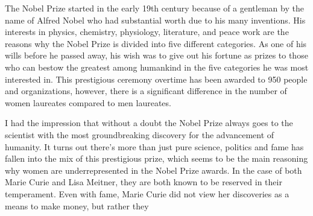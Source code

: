 
\par
The Nobel Prize started in the early 19th century because of a gentleman by the name of Alfred Nobel who had 
substantial worth due to his many inventions. His interests in physics, chemistry, physiology, literature, 
and peace work are the reasons why the Nobel Prize is divided into five different categories. As one of his 
wills before he passed away, his wish was to give out his fortune as prizes to those who can bestow the 
greatest among humankind in the five categories he was most interested in. This prestigious ceremony overtime 
has been awarded to 950 people and organizations, however, there is a significant difference in the number of 
women laureates compared to men laureates.

\par
I had the impression that without a doubt the Nobel Prize always goes to the scientist with the most groundbreaking 
discovery for the advancement of humanity. It turns out there’s more than just pure science, politics and fame has 
fallen into the mix of this prestigious prize, which seems to be the main reasoning why women are underrepresented 
in the Nobel Prize awards. In the case of both Marie Curie and Lisa Meitner, they are both known to be reserved in 
their temperament. Even with fame, Marie Curie did not view her discoveries as a means to make money, but rather 
they \cite{kopievanpbs}
